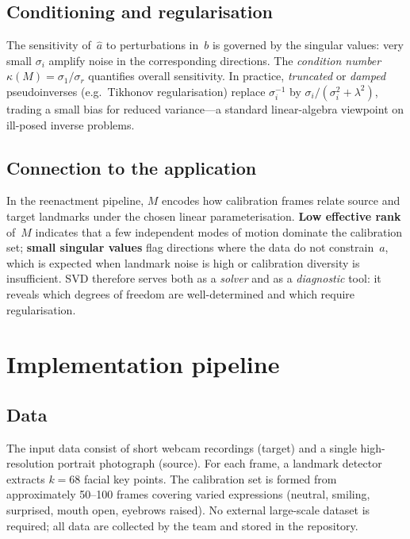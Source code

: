 \documentclass[11pt,a4paper]{article}
\begin{document}
\subsection{Conditioning and regularisation}

The sensitivity of~$\hat{a}$ to perturbations in~$b$ is governed by the singular
values: very small $\sigma_i$ amplify noise in the corresponding directions. The
\emph{condition number} $\kappa(M) = \sigma_1 / \sigma_r$ quantifies overall
sensitivity. In practice, \emph{truncated} or \emph{damped} pseudo\-inverses (e.g.\
Tikhonov regularisation) replace $\sigma_i^{-1}$ by
$\sigma_i / (\sigma_i^2 + \lambda^2)$, trading a small bias for reduced variance---a
standard linear-algebra viewpoint on ill-posed inverse problems.

\subsection{Connection to the application}

In the reenactment pipeline, $M$ encodes how calibration frames relate source and
target landmarks under the chosen linear parameterisation. \textbf{Low effective rank}
of~$M$ indicates that a few independent modes of motion dominate the calibration set;
\textbf{small singular values} flag directions where the data do not constrain~$a$,
which is expected when landmark noise is high or calibration diversity is insufficient.
SVD therefore serves both as a \emph{solver} and as a \emph{diagnostic} tool: it
reveals which degrees of freedom are well-determined and which require regularisation.

\section{Implementation pipeline}
\label{sec:pipeline}

\subsection{Data}

The input data consist of short webcam recordings (target) and a single high-resolution
portrait photograph (source). For each frame, a landmark detector extracts $k = 68$
facial key points. The calibration set is formed from approximately 50--100 frames
covering varied expressions (neutral, smiling, surprised, mouth open, eyebrows
raised). No external large-scale dataset is required; all data are collected by the
team and stored in the repository.
\end{document}

